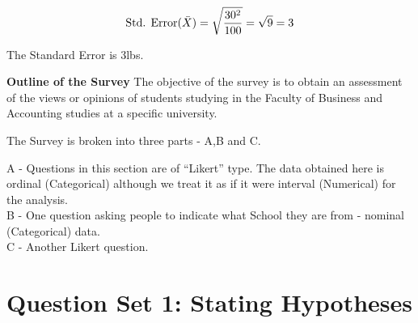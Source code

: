 \documentclass[]{report}
\begin{document}
\vspace{0.1cm}
\[
\mbox{Std. Error}(\bar{X})  = \sqrt{{30^2\over 100}} = \sqrt{9}
= 3\]

\vspace{0.1cm}

The Standard Error is 3lbs.



\noindent  \textbf{Outline of the Survey}
The objective of the survey is to obtain an assessment of the views or opinions of students studying in the Faculty of Business and Accounting studies at a specific university.

\vspace{0.4cm}

The Survey is broken into three parts - A,B and C. \\ \vspace{0.2cm}

A - Questions in this section are of ``Likert'' type. The data obtained here is ordinal (Categorical) although we treat it as if it were interval (Numerical) for the analysis.\\
\vspace{0.2cm}
B - One question asking people to indicate what School they are from - nominal (Categorical) data.\\
\vspace{0.2cm}
C - Another Likert question.




\newpage
\section*{Question Set 1: Stating Hypotheses}
\end{document}
